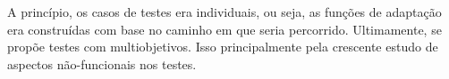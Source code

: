 A princípio, os casos de testes era individuais, ou seja, as funções de adaptação era construídas com base no caminho em que seria percorrido. Ultimamente, se propõe testes com multiobjetivos. Isso principalmente pela crescente estudo de aspectos não-funcionais nos testes.












